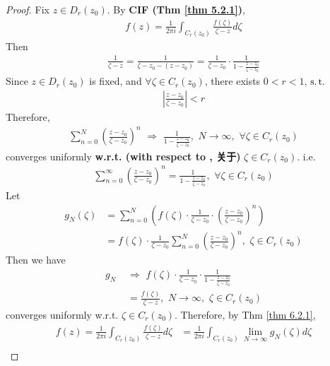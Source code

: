 \begin{thm}
		\begin{proof}
			Fix $z \in D_{r}(z_0)$. By \textbf{CIF (Thm \ref{thm 5.2.1})},
			\begin{align}
				f(z) = \frac{1}{2\pi i}\int_{C_{r}(z_0)}{\frac{f(\zeta)}{\zeta - z} d\zeta}
			\end{align}
			Then
			\begin{align}
				\frac{1}{\zeta - z} 
				= \frac{1}{\zeta - z_0 - (z - z_0)} 
				= \frac{1}{\zeta - z_0} \cdot \frac{1}{1 - \frac{z - z_0}{\zeta - z_0}} 
			\end{align}
			Since $z \in D_{r}(z_0)$ is fixed, and $\forall \zeta \in C_{r}(z_0)$, there exists $0 < r < 1$, $\operatorname{s.t.}$
			\begin{align}
				\left| \frac{z - z_0}{\zeta - z_0} \right| < r
			\end{align}
			Therefore,
			\begin{align}
				\sum_{n = 0}^{N}{\left( \frac{z - z_0}{\zeta - z_0} \right)^n} \,\, \Rightarrow \,\, \frac{1}{1 - \frac{z - z_0}{\zeta - z_0}} , \,\, N \to \infty , \,\, \forall \zeta \in C_{r}(z_0)
			\end{align}
			converges uniformly \textbf{w.r.t. (with respect to , 关于)} $\zeta \in C_{r}(z_0)$. i.e.
			\begin{align}
				\sum_{n = 0}^{\infty}{\left( \frac{z - z_0}{\zeta - z_0} \right)^n} = \frac{1}{1 - \frac{z - z_0}{\zeta - z_0}} , \,\, \forall \zeta \in C_{r}(z_0)
			\end{align}
			Let
			\begin{align}
				g_{N}(\zeta)
				&= \sum_{n = 0}^{N}{\left( f(\zeta) \cdot \frac{1}{\zeta - z_0} \cdot \left( \frac{z - z_0}{\zeta - z_0} \right)^n \right)} \\
				&= f(\zeta) \cdot \frac{1}{\zeta - z_0} \sum_{n = 0}^{N}{\left( \frac{z - z_0}{\zeta - z_0} \right)^n} , \,\, \zeta \in C_{r}(z_0)
			\end{align}
			Then we have
			\begin{align}
				g_{N} \,\, &\Rightarrow \,\, f(\zeta) \cdot \frac{1}{\zeta - z_0} \cdot \frac{1}{1 - \frac{z - z_0}{\zeta - z_0}} \\
				&= \frac{f(\zeta)}{\zeta - z} , \,\, N \to \infty , \,\, \zeta \in C_{r}(z_0)
			\end{align}
			converges uniformly w.r.t. $\zeta \in C_{r}(z_0)$. Therefore, by Thm \ref{thm 6.2.1},
			\begin{align}
				f(z) 
				= \frac{1}{2\pi i}\int_{C_{r}(z_0)}{\frac{f(\zeta)}{\zeta - z} d\zeta}
				&= \frac{1}{2\pi i} \int_{C_{r}(z_0)}{\lim_{N \to \infty}{g_{N}(\zeta) d\zeta}} \\

\end{align}
\end{proof}
\end{thm}
